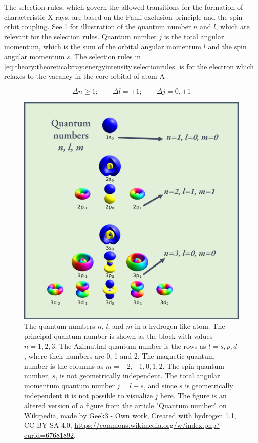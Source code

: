 The selection rules, which govern the allowed transitions for the formation of characteristic X-rays, are based on the Pauli exclusion principle and the spin-orbit coupling.
See \cref{fig:theory:theoreticalxray:energyintensity:quantumnumbers} for illustration of the quantum number $n$ and $l$, which are relevant for the selection rules.
Quantum number $j$ is the total angular momentum, which is the sum of the orbital angular momentum $l$ and the spin angular momentum $s$.
The selection rules in \cref{eq:theory:theoreticalxray:energyintensity:selectionrules} is for the electron which relaxes to the vacancy in the core orbital of atom A \cite[Sec. 8.2.2.2]{hollas_modern_2004}.

\begin{equation}
    \label{eq:theory:theoreticalxray:energyintensity:selectionrules}
    \Delta n \ge 1;\qquad \Delta l  = \pm 1;\qquad \Delta j = 0, \pm 1
\end{equation}

\begin{figure}[p]
    \centering
    \includegraphics[width=0.8\linewidth]{figures/wikipedia-quantum-numbers-n-l-j.png}
    \caption{
        The quantum numbers $n$, $l$, and $m$ in a hydrogen-like atom.
        The principal quantum number is shown as the block with values $n= 1, 2, 3$.
        The Azimuthal quantum number is the rows as $l = s, p, d$, where their numbers are 0, 1 and 2.
        The magnetic quantum number is the columns as $m = -2, -1, 0, 1, 2 $.
        The spin quantum number, $s$, is not geometrically independent.
        The total angular momentum quantum number $j = l + s$, and since $s$ is geometrically independent it is not possible to visualize $j$ here.
        The figure is an altered version of a figure from the article "Quantum number" on Wikipedia, made by Geek3 - Own work, Created with hydrogen 1.1, CC BY-SA 4.0, \url{https://commons.wikimedia.org/w/index.php?curid=67681892}.
    }
    \label{fig:theory:theoreticalxray:energyintensity:quantumnumbers}
\end{figure}


